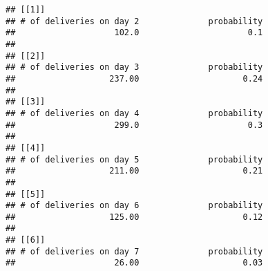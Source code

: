 \documentclass[]{article}
\begin{document}
\begin{verbatim}
## [[1]]
## # of deliveries on day 2              probability 
##                    102.0                      0.1 
## 
## [[2]]
## # of deliveries on day 3              probability 
##                   237.00                     0.24 
## 
## [[3]]
## # of deliveries on day 4              probability 
##                    299.0                      0.3 
## 
## [[4]]
## # of deliveries on day 5              probability 
##                   211.00                     0.21 
## 
## [[5]]
## # of deliveries on day 6              probability 
##                   125.00                     0.12 
## 
## [[6]]
## # of deliveries on day 7              probability 
##                    26.00                     0.03
\end{verbatim}
\end{document}
